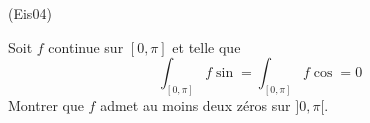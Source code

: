 \begin{tiny}(Eis04)\end{tiny}
Soit $f$ continue sur $[0,\pi]$ et telle que
\[\int_{[0,\pi]}f\sin = \int_{[0,\pi]}f\cos = 0\]
Montrer que $f$ admet au moins deux zéros sur $]0,\pi[$.
